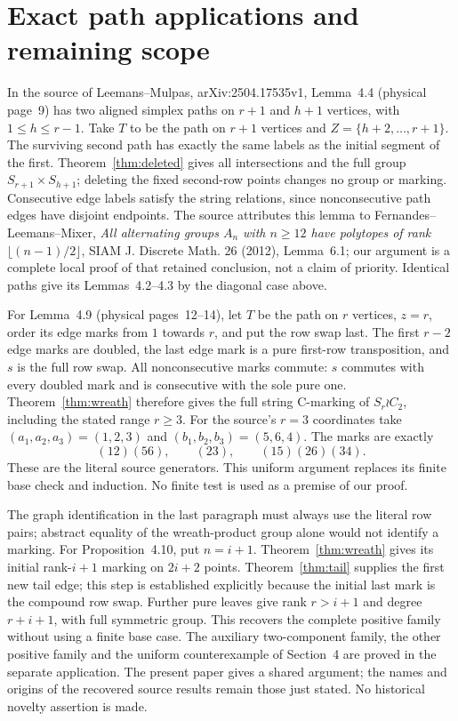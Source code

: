 \documentclass[a4paper,11pt]{article}
\begin{document}
\section{Exact path applications and remaining scope}
In the source of Leemans--Mulpas, arXiv:2504.17535v1, Lemma~4.4 (physical
page~9) has two aligned simplex paths on $r+1$ and $h+1$ vertices, with
$1\leq h\leq r-1$. Take $T$ to be the path on $r+1$ vertices and
$Z=\{h+2,\ldots,r+1\}$. The surviving second path has exactly the same
labels as the initial segment of the first. Theorem~\ref{thm:deleted} gives
all intersections and the full group $S_{r+1}\times S_{h+1}$; deleting the
fixed second-row points changes no group or marking. Consecutive edge labels
satisfy the string relations, since nonconsecutive path edges have disjoint
endpoints. The source attributes this lemma to Fernandes--Leemans--Mixer,
\emph{All alternating groups $A_n$ with $n\geq12$ have polytopes of rank
$\lfloor(n-1)/2\rfloor$}, SIAM J. Discrete Math. 26 (2012),
Lemma~6.1;
our argument is a complete local proof of that retained conclusion, not a
claim of priority. Identical paths give its Lemmas~4.2--4.3 by the diagonal
case above.

For Lemma~4.9 (physical pages~12--14), let $T$ be the path on $r$ vertices,
$z=r$, order its edge marks from $1$ towards $r$, and put the row swap last.
The first $r-2$ edge marks are doubled, the last edge mark is a pure
first-row transposition, and $s$ is the full row swap. All nonconsecutive
marks commute: $s$ commutes with every doubled mark and is consecutive with
the sole pure one. Theorem~\ref{thm:wreath} therefore gives the full string
C-marking of $S_r\wr C_2$, including the stated range $r\geq3$.
For the source's $r=3$ coordinates take
$(a_1,a_2,a_3)=(1,2,3)$ and $(b_1,b_2,b_3)=(5,6,4)$.
The marks are exactly
\[
 (12)(56),\qquad(23),\qquad(15)(26)(34).
\]
These are the literal source generators. This uniform argument
replaces its finite base check and induction. No finite test is used as a
premise of our proof.

The graph identification in the last paragraph must always use the literal
row pairs; abstract equality of the wreath-product group alone would not
identify a marking. For Proposition~4.10, put $n=i+1$. Theorem~\ref{thm:wreath} gives its
initial rank-$i+1$ marking on $2i+2$ points. Theorem~\ref{thm:tail}
supplies the first new tail edge; this step is established explicitly because
the initial last mark is the compound row swap. Further pure leaves give
rank $r>i+1$ and degree $r+i+1$, with full symmetric group. This recovers
the complete positive family without using a finite base case.
The auxiliary two-component family, the other positive family and the uniform
counterexample of Section~4 are proved in the separate application. The present
paper gives a shared argument; the names and origins of the recovered source
results remain those just stated. No historical novelty assertion is made.
\end{document}
